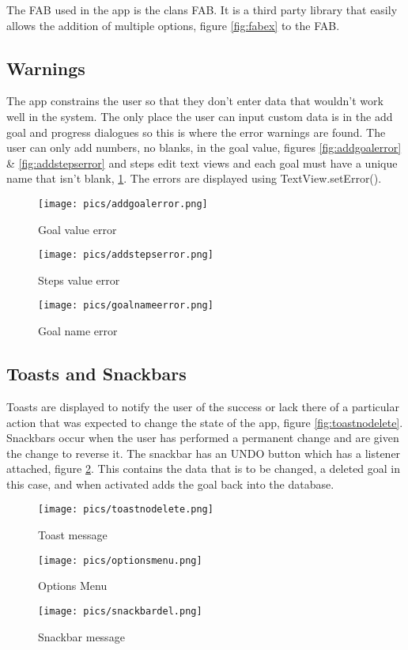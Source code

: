 \documentclass[12pt]{report}
\begin{document}
The FAB used in the app is the clans FAB. It is a third party library that easily allows the addition of multiple options, figure \ref{fig:fabex} to the FAB. 

\subsection{Warnings}

The app constrains the user so that they don't enter data that wouldn't work well in the system. The only place the user can input custom data is in the add goal and progress dialogues so this is where the error warnings are found. The user can only add numbers, no blanks, in the goal value, figures \ref{fig:addgoalerror} \& \ref{fig:addstepserror} and steps edit text views and each goal must have a unique name that isn't blank, \ref{fig:goalnameerror}. The errors are displayed using TextView.setError().


\begin{figure}[!htb]
  \texttt{[image: pics/addgoalerror.png]}
  \caption{Goal value error}
  \label{fig:addgoalerror}
\endminipage\hfill
{}
  \texttt{[image: pics/addstepserror.png]}
  \caption{Steps value error}\label{fig:addstepserror}
\endminipage\hfill
{}
  \texttt{[image: pics/goalnameerror.png]}
  \caption{Goal name error}\label{fig:goalnameerror}
\endminipage
\end{figure}

\subsection{Toasts and Snackbars}

Toasts are displayed to notify the user of the success or lack there of a particular action that was expected to change the state of the app, figure \ref{fig:toastnodelete}. Snackbars occur when the user has performed a permanent change and are given the change to reverse it. The snackbar has an UNDO button which has a listener attached, figure \ref{fig:snackbardel}. This contains the data that is to be changed, a deleted goal in this case, and when activated adds the goal back into the database.

\begin{figure}[!htb]
  \texttt{[image: pics/toastnodelete.png]}
  \caption{Toast message}
  \label{fig:toastnodelete}
\endminipage\hfill
{}
  \texttt{[image: pics/optionsmenu.png]}
  \caption{Options Menu}\label{fig:menu}
\endminipage\hfill
{}
  \texttt{[image: pics/snackbardel.png]}
  \caption{Snackbar message}\label{fig:snackbardel}
\endminipage
\end{figure}
\end{document}
